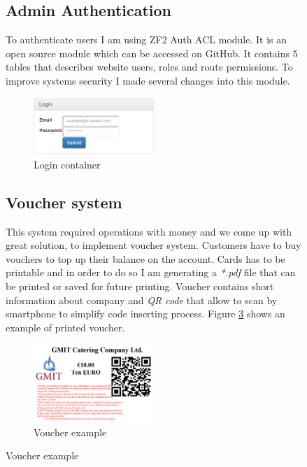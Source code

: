 \begin{figure}
	\subsection{Admin Authentication}
To authenticate users I am using ZF2 Auth ACL module. It is an open source module which can be accessed on GitHub. It contains 5 tables that describes website users, roles and route permissions. To improve systems security I made several changes into this module.
	~\cite{Website_authentication}

\begin{figure}[H]
	\centering
	\includegraphics[width=0.5\textwidth]{img/zf2/login-container.png}
	\caption{Login container}
	\label{fig:login-container}
\end{figure}
	
	\subsection{Voucher system}

This system required operations with money and we come up with great solution, to implement voucher system. Customers have to buy vouchers to top up their balance on the account. Cards has to be printable and in order to do so I am generating a \textit{*.pdf} file that can be printed or saved for future printing. Voucher contains short information about company and \textit{QR code} that allow to scan by smartphone to simplify code inserting process. Figure \ref{fig:voucher} shows an example of printed voucher.

\begin{figure}[H]
	\centering
	\includegraphics[width=0.5\textwidth]{img/zf2/voucher-example.png}
	\caption{Voucher example}
	\label{fig:voucher}
\end{figure}
	

\end{figure}
